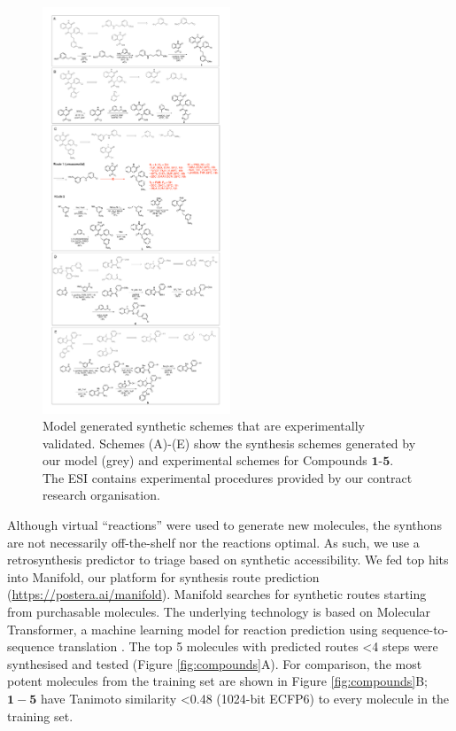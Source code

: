 \begin{figure}
\centering
    \includegraphics[width=0.5\textwidth]{Chapters/Ranking/Figs/aaron_schemes.pdf}
    \caption{Model generated synthetic schemes that are experimentally validated. Schemes (A)-(E) show the synthesis schemes generated by our model (grey) and experimental schemes for Compounds $\mathbf{1}$-$\mathbf{5}$. The ESI contains experimental procedures provided by our contract research organisation.}
    \label{fig:synthesis_schemes}
\end{figure}

Although virtual ``reactions'' were used to generate new molecules, the synthons are not necessarily off-the-shelf nor the reactions optimal. As such, we use a retrosynthesis predictor to triage based on synthetic accessibility. We fed top hits into Manifold, our platform for synthesis route prediction (\url{https://postera.ai/manifold}). Manifold searches for synthetic routes starting from purchasable molecules. The underlying technology is based on Molecular Transformer, a machine learning model for reaction prediction using sequence-to-sequence translation \citep{yang2019molecular,schwaller2019molecular}. The top 5 molecules with predicted routes <4 steps were synthesised and tested (Figure \ref{fig:compounds}A). For comparison, the most potent molecules from the training set are shown in Figure \ref{fig:compounds}B; $\mathbf{1}-\mathbf{5}$ have Tanimoto similarity <0.48 (1024-bit ECFP6) to every molecule in the training set. 

